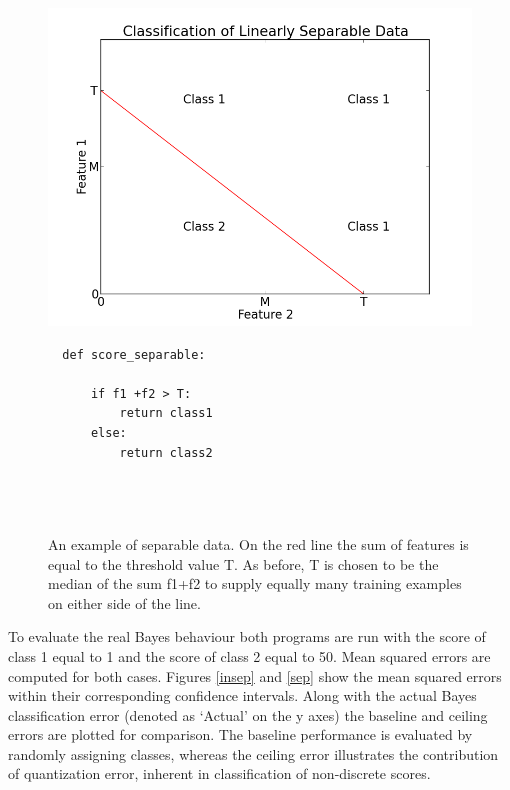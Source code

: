 \documentclass[12pt,notitlepage,twoside]{scrreprt}
\begin{document}
\begin{figure}[h!]
\begin{minipage}[b]{0.55\linewidth}
  \includegraphics[width=1.2\linewidth]{figs/gen_sep.png}
\end{minipage}
\hspace{0.5cm}
\begin{minipage}[b]{0.4\linewidth}
\begin{verbatim}
  def score_separable:

      if f1 +f2 > T:
          return class1
      else:
          return class2




\end{verbatim}
\end{minipage}
\caption{An example of separable data. On the red line the sum of features is equal to the
threshold value T.  As before, T is chosen to be the median of the sum f1+f2 to supply
equally many training examples on either side of the line. \label{code:sep}}
\end{figure}

To evaluate the real Bayes behaviour both programs are run with the score of class 1
equal to 1 and the score of class 2 equal to 50. Mean squared errors are computed for both cases.
Figures \ref{insep} and \ref{sep} show the mean squared errors within their corresponding
confidence intervals.  Along with the actual Bayes classification error (denoted as
`Actual' on the y axes) the baseline and ceiling errors are plotted for comparison. The
baseline performance is evaluated by randomly assigning classes, whereas the ceiling error
illustrates the contribution of quantization error, inherent in classification of
non-discrete scores.
\end{document}
